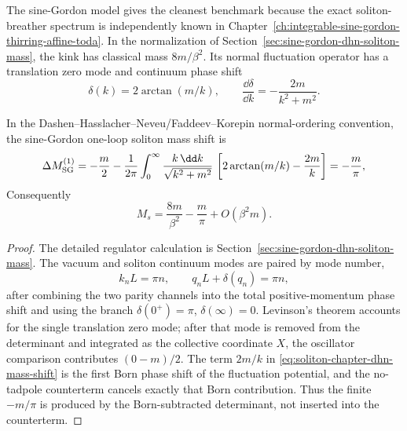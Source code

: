 The sine-Gordon model gives the cleanest benchmark because the exact
soliton-breather spectrum is independently known in
Chapter~\ref{ch:integrable-sine-gordon-thirring-affine-toda}.  In the
normalization of Section~\ref{sec:sine-gordon-dhn-soliton-mass}, the kink
has classical mass \(8m/\beta^2\).  Its normal fluctuation operator has a
translation zero mode and continuum phase shift
\begin{equation}
  \delta(k)=2\arctan(m/k),
  \qquad
  \frac{\dd\delta}{\dd k}
  =
  -\frac{2m}{k^2+m^2}.
  \label{eq:soliton-chapter-sg-phase-shift}
\end{equation}

\begin{proposition}
\label{prop:soliton-chapter-dhn-mass-shift}
In the Dashen--Hasslacher--Neveu/Faddeev--Korepin normal-ordering convention,
the sine-Gordon one-loop soliton mass shift is
\begin{equation}
  \Delta M_{\rm SG}^{(1)}
  =
  -\frac m2
  -
  \frac{1}{2\pi}
  \int_0^\infty
  \frac{k\,\dd k}{\sqrt{k^2+m^2}}\,
  \left[
    2\arctan(m/k)-\frac{2m}{k}
  \right]
  =
  -\frac{m}{\pi},
  \label{eq:soliton-chapter-dhn-mass-shift}
\end{equation}
Consequently
\begin{equation}
  M_s
  =
  \frac{8m}{\beta^2}-\frac{m}{\pi}+O(\beta^2m).
  \label{eq:soliton-chapter-sg-physical-mass}
\end{equation}
\end{proposition}

\begin{proof}
The detailed regulator calculation is
Section~\ref{sec:sine-gordon-dhn-soliton-mass}.  The vacuum and soliton
continuum modes are paired by mode number,
\[
  k_nL=\pi n,\qquad q_nL+\delta(q_n)=\pi n,
\]
after combining the two parity channels into the total positive-momentum
phase shift and using the branch \(\delta(0^+)=\pi\), \(\delta(\infty)=0\).
Levinson's theorem accounts for the single translation zero mode; after that
mode is removed from the determinant and integrated as the collective
coordinate \(X\), the oscillator comparison contributes \((0-m)/2\).  The
term \(2m/k\) in \eqref{eq:soliton-chapter-dhn-mass-shift} is the first Born
phase shift of the fluctuation potential, and the no-tadpole counterterm
cancels exactly that Born contribution.  Thus the finite \(-m/\pi\) is
produced by the Born-subtracted determinant, not inserted into the
counterterm.
\end{proof}

